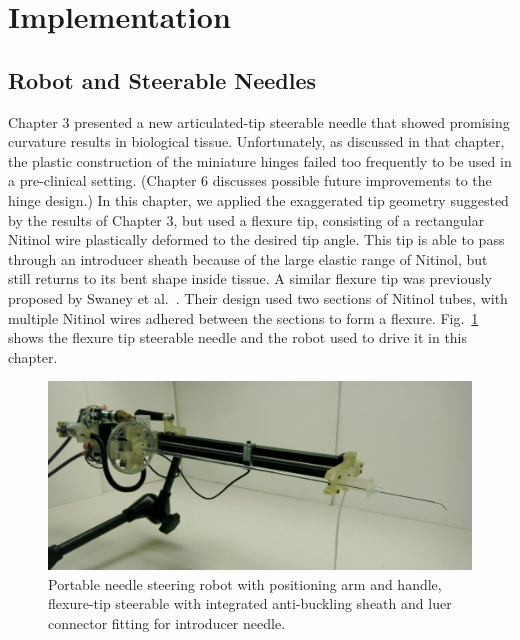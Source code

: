 \section{Implementation}
\label{sec:HumanInTheLoopImplementation}

\subsection{Robot and Steerable Needles}
\label{sec:NS2RobotAndNeedle}
Chapter 3 presented a new articulated-tip steerable needle that showed promising curvature results in biological tissue. Unfortunately, as discussed in that chapter, the plastic construction of the miniature hinges failed too frequently to be used in a pre-clinical setting. (Chapter 6 discusses possible future improvements to the hinge design.) In this chapter, we applied the exaggerated tip geometry suggested by the results of Chapter 3, but used a flexure tip, consisting of a rectangular Nitinol wire plastically deformed to the desired tip angle. This tip is able to pass through an introducer sheath because of the large elastic range of Nitinol, but still returns to its bent shape inside tissue. A similar flexure tip was previously proposed by Swaney et al.~\cite{Swaney2013}. Their design used two sections of Nitinol tubes, with multiple Nitinol wires adhered between the sections to form a flexure. Fig.~\ref{fig:NS2AndNeedle} shows the flexure tip steerable needle and the robot used to drive it in this chapter.

\begin{figure}[!ht]
\centering
\includegraphics[width = \columnwidth]{./Images/Chapter5/NS2RobotAndNeedle/NS2RobotAndNeedle.jpg}%
\caption[Robot and flexure-tip steerable needles]{Portable needle steering robot with positioning arm and handle, flexure-tip steerable with integrated anti-buckling sheath and luer connector fitting for introducer needle.}
\label{fig:NS2AndNeedle}
\end{figure}  

